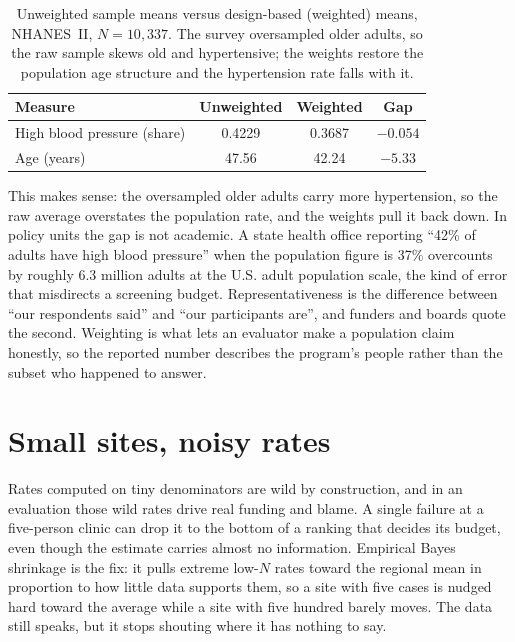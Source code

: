 \documentclass[
    a4paper,
    fontsize=10pt,
    twoside=true,
    numbers=noenddot,
]{kaobook}
\begin{document}
\begin{table}[htbp]
\centering
\caption[Weighted versus unweighted means, NHANES~II]{Unweighted sample means versus design-based (weighted) means, NHANES~II, $N=10{,}337$. The survey oversampled older adults, so the raw sample skews old and hypertensive; the weights restore the population age structure and the hypertension rate falls with it.}
\label{tab:weights}
{\footnotesize
\begin{tabular}{lccc}
\hline
Measure & Unweighted & Weighted & Gap \\
\hline
High blood pressure (share) & 0.4229 & 0.3687 & $-0.054$ \\
Age (years)                 & 47.56  & 42.24  & $-5.33$ \\
\hline
\end{tabular}
}
\end{table}

This makes sense: the oversampled older adults carry more hypertension, so the raw average overstates the population rate, and the weights pull it back down. In policy units the gap is not academic. A state health office reporting \enquote{42\% of adults have high blood pressure} when the population figure is 37\% overcounts by roughly 6.3 million adults at the U.S. adult population scale, the kind of error that misdirects a screening budget. Representativeness is the difference between \enquote{our respondents said} and \enquote{our participants are}, and funders and boards quote the second. Weighting is what lets an evaluator make a population claim honestly, so the reported number describes the program's people rather than the subset who happened to answer.

\section{Small sites, noisy rates}\label{sec:shrink}
Rates computed on tiny denominators are wild by construction, and in an evaluation those wild rates drive real funding and blame. A single failure at a five-person clinic can drop it to the bottom of a ranking that decides its budget, even though the estimate carries almost no information. Empirical Bayes shrinkage is the fix: it pulls extreme low-$N$ rates toward the regional mean in proportion to how little data supports them, so a site with five cases is nudged hard toward the average while a site with five hundred barely moves. The data still speaks, but it stops shouting where it has nothing to say.
\end{document}
